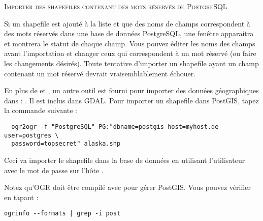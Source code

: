 \begin{Tip}\caption{\textsc{Importer des shapefiles contenant des mots réservés de PostgreSQL}}
Si un shapefile est ajouté à la liste et que des noms de champs correspondent à des mots réservés dans une base de données PostgreSQL, une fenêtre apparaitra et montrera le statut de chaque champ. Vous pouvez éditer les noms des champs avant l'importation et changer ceux qui correspondent à un mot réservé (ou faire les changements désirés). Toute tentative d'importer un shapefile ayant un champ contenant un mot réservé devrait vraisemblablement échouer.
\end{Tip}

En plus de  et , un autre outil est fourni pour importer des données géographiques dans \pg : . Il est inclus dans GDAL.
Pour importer un shapefile dans PostGIS, tapez la commande suivante :
\begin{verbatim}
  ogr2ogr -f "PostgreSQL" PG:"dbname=postgis host=myhost.de user=postgres \
  password=topsecret" alaska.shp
\end{verbatim}

Ceci va importer le shapefile \filename{alaska.shp} dans la base de données \pg \usertext{postgis} en utilisant l'utilisateur \usertext{postgres} avec le mot de passe \usertext{topsecret} sur l'hôte \server{myhost.de}.

Notez qu'OGR doit être compilé avec \psq pour gérer PostGIS. Vous pouvez vérifier en tapant :
\begin{verbatim}
ogrinfo --formats | grep -i post
\end{verbatim}

